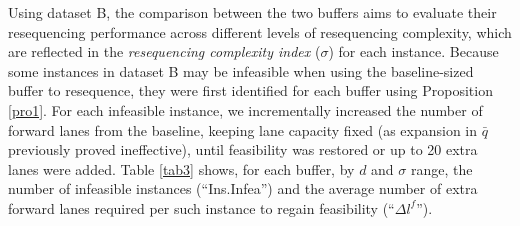 \documentclass[12pt]{article}
\begin{document}





Using dataset B, the comparison between the two buffers aims to evaluate their resequencing performance across different levels of resequencing complexity, which are reflected in the \textit{resequencing complexity index} ($\sigma$) for each instance. Because some instances in dataset B may be infeasible when using the baseline-sized buffer to resequence, they were first identified for each buffer using Proposition \ref{pro1}. For each infeasible instance, we incrementally increased the number of forward lanes from the baseline, keeping lane capacity fixed (as expansion in $\bar{q}$ previously proved ineffective), until feasibility was restored or up to 20 extra lanes were added. Table \ref{tab3} shows, for each buffer, by $d$ and $\sigma$ range, the number of infeasible instances (``Ins.Infea'') and the average number of extra forward lanes required per such instance to regain feasibility (``$\Delta l^f$'').
\end{document}
